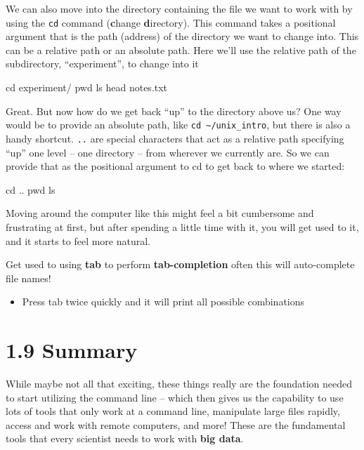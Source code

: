 \documentclass[
]{book}
\newenvironment{Shaded}{\begin{snugshade}}{\end{snugshade}}
\newcommand{\BuiltInTok}[1]{#1}
\newcommand{\FunctionTok}[1]{\textcolor[rgb]{0.00,0.00,0.00}{#1}}
\newcommand{\NormalTok}[1]{#1}
\providecommand{\tightlist}{%
  \setlength{\itemsep}{0pt}\setlength{\parskip}{0pt}}
\begin{document}
We can also move into the directory containing the file we want to work with by using the \texttt{cd} command (\textbf{c}hange \textbf{d}irectory). This command takes a positional argument that is the path (address) of the directory we want to change into. This can be a relative path or an absolute path. Here we'll use the relative path of the subdirectory, ``experiment'', to change into it

\begin{Shaded}
\begin{Highlighting}[]
    \BuiltInTok{cd}\NormalTok{ experiment/}
    \BuiltInTok{pwd}
    \FunctionTok{ls}
    \FunctionTok{head}\NormalTok{ notes.txt}
\end{Highlighting}
\end{Shaded}

Great. But now how do we get back ``up'' to the directory above us? One way would be to provide an absolute path, like \texttt{cd\ \textasciitilde{}/unix\_intro}, but there is also a handy shortcut. \texttt{..} are special characters that act as a relative path specifying ``up'' one level -- one directory -- from wherever we currently are. So we can provide that as the positional argument to cd to get back to where we started:

\begin{Shaded}
\begin{Highlighting}[]
    \BuiltInTok{cd}\NormalTok{ ..}
    \BuiltInTok{pwd}
    \FunctionTok{ls}
\end{Highlighting}
\end{Shaded}

Moving around the computer like this might feel a bit cumbersome and frustrating at first, but after spending a little time with it, you will get used to it, and it starts to feel more natural.

Get used to using \textbf{tab} to perform \textbf{tab-completion} often this will auto-complete file names!

\begin{itemize}
\tightlist
\item
  Press tab twice quickly and it will print all possible combinations
\end{itemize}

\hypertarget{summary}{%
\section{1.9 Summary}\label{summary}}

While maybe not all that exciting, these things really are the foundation needed to start utilizing the command line -- which then gives us the capability to use lots of tools that only work at a command line, manipulate large files rapidly, access and work with remote computers, and more! These are the fundamental tools that every scientist needs to work with \textbf{big data}.
\end{document}
